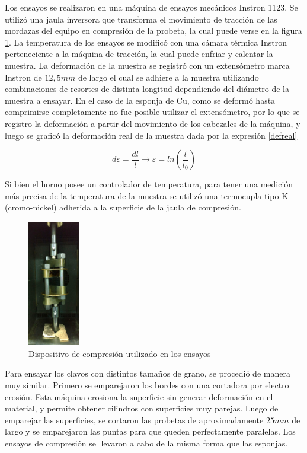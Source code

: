 \documentclass[a4paper,12pt,fleqn,twoside,openany]{book}
\begin{document}
Los ensayos se realizaron en una máquina de ensayos mecánicos Instron 1123. Se utilizó una jaula inversora que transforma el movimiento de tracción de las mordazas del equipo en compresión de la probeta, la cual puede verse en la figura \ref{fig:jaula}. La 
temperatura de los ensayos se modificó con una cámara térmica Instron perteneciente a la máquina de tracción, la cual puede enfriar y calentar la muestra.
La deformación de la muestra se registró con un extensómetro marca Instron de $12,5 mm$ de largo el cual se adhiere a la muestra utilizando combinaciones de 
resortes de distinta longitud dependiendo del diámetro de la muestra a ensayar. En el caso de la esponja de Cu, como se deformó hasta comprimirse 
completamente no fue posible utilizar el extensómetro, por lo que se registro la deformación a partir del movimiento de los cabezales de la máquina, y luego 
se graficó la deformación real de la muestra dada por la expresión \ref{defreal}

\begin{equation}
d \varepsilon = \frac{dl}{l}  \longrightarrow  \varepsilon =ln \left(\frac{l}{l_0}\right) \label{defreal} 
\end{equation}

Si bien el horno posee un controlador de temperatura, para tener una medición
más precisa de la temperatura de la muestra se utilizó una termocupla tipo K (cromo-nickel) adherida a la superficie de la jaula de compresión.

\begin{figure}[h]
 \centering
 \includegraphics[width=0.2\textwidth]{Img/Procedimiento/jaula.jpg}
 \caption{Dispositivo de compresión utilizado en los ensayos} 
 \label{fig:jaula}
 \end{figure}


Para ensayar los clavos con distintos tamaños de grano, se procedió de manera muy similar. Primero se emparejaron los bordes con una cortadora por electro erosión. Esta máquina erosiona la superficie sin generar deformación en el material, y permite obtener cilindros con superficies muy parejas. Luego de emparejar las superficies, se cortaron las probetas de aproximadamente $25 mm$ de largo y se emparejaron las puntas para que queden perfectamente paralelas. 
Los ensayos de compresión se llevaron a cabo de la misma forma que las esponjas. 
 
\end{document}
